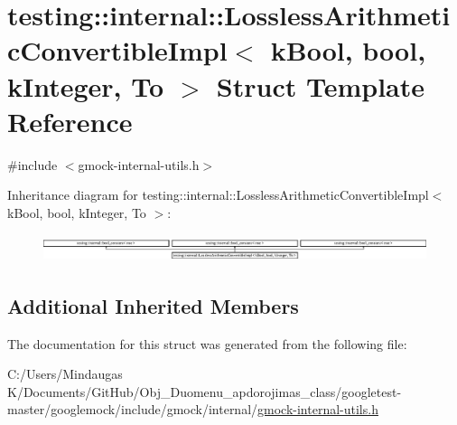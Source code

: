 \hypertarget{structtesting_1_1internal_1_1_lossless_arithmetic_convertible_impl_3_01k_bool_00_01bool_00_01k_integer_00_01_to_01_4}{}\section{testing\+::internal\+::Lossless\+Arithmetic\+Convertible\+Impl$<$ k\+Bool, bool, k\+Integer, To $>$ Struct Template Reference}
\label{structtesting_1_1internal_1_1_lossless_arithmetic_convertible_impl_3_01k_bool_00_01bool_00_01k_integer_00_01_to_01_4}


{\ttfamily \#include $<$gmock-\/internal-\/utils.\+h$>$}

Inheritance diagram for testing\+::internal\+::Lossless\+Arithmetic\+Convertible\+Impl$<$ k\+Bool, bool, k\+Integer, To $>$\+:\begin{figure}[H]
\begin{center}
\leavevmode
\includegraphics[height=0.801144cm]{d3/d86/structtesting_1_1internal_1_1_lossless_arithmetic_convertible_impl_3_01k_bool_00_01bool_00_01k_integer_00_01_to_01_4}
\end{center}
\end{figure}
\subsection*{Additional Inherited Members}


The documentation for this struct was generated from the following file\+:\begin{DoxyCompactItemize}
\item 
C\+:/\+Users/\+Mindaugas K/\+Documents/\+Git\+Hub/\+Obj\+\_\+\+Duomenu\+\_\+apdorojimas\+\_\+class/googletest-\/master/googlemock/include/gmock/internal/\mbox{\hyperlink{googletest-master_2googlemock_2include_2gmock_2internal_2gmock-internal-utils_8h}{gmock-\/internal-\/utils.\+h}}\end{DoxyCompactItemize}
